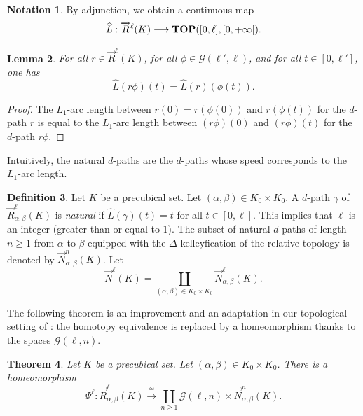 \documentclass[a4paper,12pt]{amsart}
\newcommand{\p}{\times}
\renewcommand{\vec}{\overrightarrow}
\newtheorem{thm}{Theorem}[section]
\newtheorem{lem}[thm]{Lemma}
\newcommand{\bth}{\begin{thm}}
\renewcommand{\eth}{\end{thm}}
\newcommand{\bpf}{\begin{proof}}
\newcommand{\epf}{\end{proof}}
\theoremstyle{definition}
\newtheorem{defn}[thm]{Definition}
\newcommand{\bd}{\begin{defn}}
\newcommand{\ed}{\end{defn}}
\newtheorem{nota}[thm]{Notation}
\newcommand{\iso}{\cong}
\renewcommand{\geq}{\geqslant}
\newcommand{\brm}[1]{{\rm{\mathbf{#1}}}}
\newcommand{\ttop}{{\brm{TOP}}}
\begin{document}
\begin{nota}
	By adjunction, we obtain a continuous map \[\widehat{L}:\vec{R}^\ell(K) \longrightarrow \ttop([0,\ell],[0,+\infty[).\] 
\end{nota}


\begin{lem} \label{minicalcul}
	For all $r\in \vec{R}^\ell(K)$, for all $\phi\in \mathcal{G}(\ell',\ell)$, and for all $t\in [0,\ell']$, one has \[\widehat{L}(r\phi)(t) = \widehat{L}(r)(\phi(t)).\]
\end{lem}

\bpf
The $L_1$-arc length between $r(0)=r(\phi(0))$ and $r(\phi(t))$ for the $d$-path $r$ is equal to the $L_1$-arc length between $(r\phi)(0)$ and $(r\phi)(t)$ for the $d$-path $r\phi$.
\epf

Intuitively, the natural $d$-paths are the $d$-paths whose speed corresponds to the $L_1$-arc length.

\bd \cite[Definition~2.14]{MR2521708}
Let $K$ be a precubical set. Let $(\alpha,\beta)\in K_0\p K_0$. A $d$-path $\gamma$ of $\vec{R}^\ell_{\alpha,\beta}(K)$ is \textit{natural} if $\widehat{L}(\gamma)(t)=t$ for all $t\in [0,\ell]$. This implies that $\ell$ is an integer (greater than or equal to $1$). The subset of natural $d$-paths of length $n\geq 1$ from $\alpha$ to $\beta$ equipped with the $\Delta$-kelleyfication of the relative topology is denoted by $\vec{N}^n_{\alpha,\beta}(K)$. Let 
\[
\vec{N}^\ell(K) = \coprod_{(\alpha,\beta)\in K_0\p K_0} \vec{N}^\ell_{\alpha,\beta}(K).
\]
\ed

The following theorem is an improvement and an adaptation in our topological setting of \cite[Proposition~2.16]{MR2521708}: the homotopy equivalence is replaced by a homeomorphism thanks to the spaces $\mathcal{G}(\ell,n)$. 

\bth \label{Psi}
Let $K$ be a precubical set. Let $(\alpha,\beta)\in K_0\p K_0$. There is a homeomorphism 
\[
\Psi^{\ell}:\vec{R}_{\alpha,\beta}^{\ell}(K) \stackrel{\iso}\longrightarrow \displaystyle\coprod_{n\geq 1} \mathcal{G}(\ell,n) \p \vec{N}_{\alpha,\beta}^n(K).
\]
\eth
\end{document}

